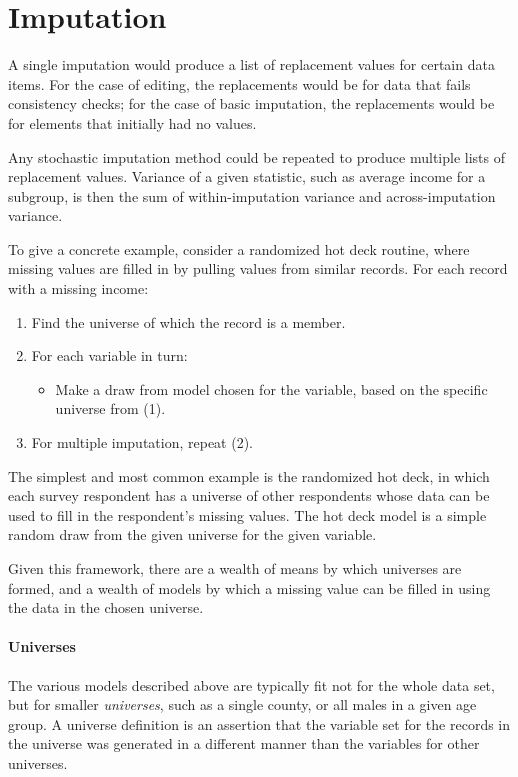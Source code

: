 \documentclass{article}
\def\tighten{ \setlength{\itemsep}{1pt}
    \setlength{\parskip}{0pt}}
\begin{document}
\section{Imputation} \label{imputesec}
A single imputation would produce a list of replacement values for certain data
items. For the case of editing, the replacements would be for data that fails consistency
checks; for the case of basic imputation, the replacements would be for elements that
initially had no values.

Any stochastic imputation method could be repeated to produce multiple lists
of replacement values. Variance of a given statistic, such as average income for a
subgroup, is then the sum of within-imputation variance and across-imputation variance.

To give a concrete example, consider a randomized hot deck routine, where missing values are
filled in by pulling values from similar records. For each record with a missing income:

\begin{enumerate}
\tighten
\item Find the universe of which the record is a member.
\item For each variable in turn:
    \begin{itemize}
    \item Make a draw from model chosen for the variable, based on the specific universe from (1).
    \end{itemize}
\item For multiple imputation, repeat (2).
\end{enumerate}

The simplest and most common example is the randomized hot deck, in which each survey respondent has
a universe of other respondents whose data can be used to fill in the respondent's missing
values. The hot deck model is a simple random draw from the given universe for the given variable.

Given this framework, there are a wealth of means by which universes are formed, and
a wealth of models by which a missing value can be filled in using the data in the chosen universe.

\paragraph{Universes}
The various models described above are typically fit not for the whole data set, but for
smaller {\em universes}, such as a single county, or all males in a given age group.
A universe definition is an assertion that the variable set for the records in the
universe was generated in a different manner than the variables for other universes.
\end{document}
